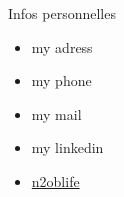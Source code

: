 \vspace{1cm}

\hspace*{-2mm}
{\fontsize{16}{10}\selectfont {} \hspace{1.5mm} Infos personnelles} \newline
\vspace{-5mm}
\begin{itemize}[noitemsep]
    \item[\faHome] {my adress}
     \item[\faPhone] my phone
    \item[\faAt] my mail
    \item[\faLinkedin] my linkedin
    \item[\faGithub] \href{https://github.com/n2oblife}{n2oblife}
\end{itemize}